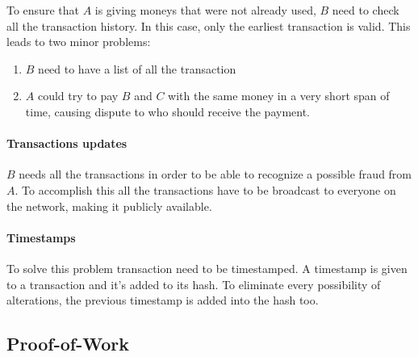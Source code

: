 To ensure that $A$ is giving moneys that were not already used, $B$ need to
check all the transaction history. In this case, only the earliest transaction
is valid\cite{nakamoto08}. This leads to two minor problems:
\begin{enumerate}
 \item $B$ need to have a list of all the transaction
 \item $A$ could try to pay $B$ and $C$ with the same money in a very short
span of time, causing dispute to who should receive the payment.
\end{enumerate}

\paragraph*{Transactions updates}
$B$ needs all the transactions in order to be able to recognize a possible
fraud from $A$. To accomplish this all the transactions have to be broadcast to
everyone on the network, making it publicly available.

\paragraph*{Timestamps}
To solve this problem transaction need to be timestamped. A timestamp is given
to a transaction and it's added to its hash. To eliminate every possibility of
alterations, the previous timestamp is added into the hash too.


\subsection{Proof-of-Work}
